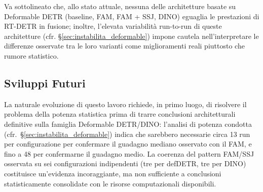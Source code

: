 \documentclass[a4paper,11pt]{article}
\begin{document}
Va sottolineato che, allo stato attuale, nessuna delle architetture basate su Deformable DETR (baseline, FAM, FAM + SSJ, DINO) eguaglia le prestazioni di RT-DETR in fusione; inoltre, l'elevata variabilità run-to-run di queste architetture (cfr. \S\ref{sec:instabilita_deformable}) impone cautela nell'interpretare le differenze osservate tra le loro varianti come miglioramenti reali piuttosto che rumore statistico.


\subsection*{Sviluppi Futuri}
La naturale evoluzione di questo lavoro richiede, in primo luogo, di risolvere il problema della potenza statistica prima di trarre conclusioni architetturali definitive sulla famiglia Deformable DETR/DINO: l'analisi di potenza condotta (cfr.\ \S\ref{sec:instabilita_deformable}) indica che sarebbero necessarie circa 13 run per configurazione per confermare il guadagno mediano osservato con il FAM, e fino a 48 per confermarne il guadagno medio. La coerenza del pattern FAM/SSJ osservata su sei configurazioni indipendenti (tre per defDETR, tre per DINO) costituisce un'evidenza incoraggiante, ma non sufficiente a conclusioni statisticamente consolidate con le risorse computazionali disponibili.
\end{document}
